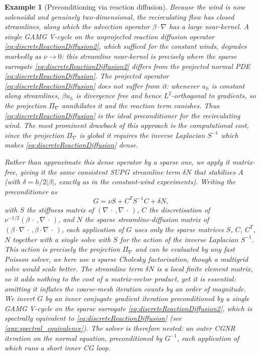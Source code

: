 \documentclass[hidelinks,onefignum,onetabnum]{siamart220329}
\newtheorem{example}{Example}
\begin{document}
\begin{example}[Preconditioning via reaction diffusion]
{    Because the wind is now solenoidal and genuinely two-dimensional, the recirculating flow has closed streamlines, along which the advection operator $\beta\cdot\nabla$ has a large near-kernel. A single GAMG V-cycle on the unprojected reaction diffusion operator \eqref{eq:discreteReactionDiffusion2}, which sufficed for the constant winds, degrades markedly as $\nu\to 0$: this streamline near-kernel is precisely where the sparse surrogate \eqref{eq:discreteReactionDiffusion2} differs from the projected normal PDE \eqref{eq:discreteReactionDiffusion}. The projected operator \eqref{eq:discreteReactionDiffusion} does not suffer from it: whenever $u_h$ is constant along streamlines, $\beta u_h$ is divergence free and hence $L^2$-orthogonal to gradients, so the projection $\Pi_\nabla$ annihilates it and the reaction term vanishes. Thus \eqref{eq:discreteReactionDiffusion} is the ideal preconditioner for the recirculating wind. The most prominent drawback of this approach is the computational cost, since the projection $\Pi_\nabla$ is global it requires the inverse Laplacian $S^{-1}$ which makes \eqref{eq:discreteReactionDiffusion} dense.

    Rather than approximate this dense operator by a sparse one, we apply it \emph{matrix-free}, giving it the same consistent SUPG streamline term $\delta N$ that stabilises $A$ (with $\delta = h/2|\beta|$, exactly as in the constant-wind experiments). Writing the preconditioner as
    \begin{equation}
        \label{eq:glazingMatFree}
        G = \nu S + C^{T} S^{-1} C + \delta N,
    \end{equation}
    with $S$ the stiffness matrix of $(\nabla\,\cdot\,,\nabla\,\cdot\,)$, $C$ the discretisation of $\nu^{-1/2}(\beta\,\cdot\,,\nabla\,\cdot\,)$, and $N$ the sparse streamline-diffusion matrix of $(\beta\cdot\nabla\,\cdot\,,\beta\cdot\nabla\,\cdot\,)$, each application of $G$ uses only the sparse matrices $S$, $C$, $C^{T}$, $N$ together with a single solve with $S$ for the action of the inverse Laplacian $S^{-1}$. This action is precisely the projection $\Pi_\nabla$ and can be evaluated by any fast Poisson solver, we here use a sparse Cholesky factorisation, though a multigrid solve would scale better. The streamline term $\delta N$ is a local finite element matrix, so it adds nothing to the cost of a matrix-vector product, yet it is essential: omitting it inflates the coarse-mesh iteration counts by an order of magnitude. We invert $G$ by an inner conjugate gradient iteration preconditioned by a single GAMG V-cycle on the sparse surrogate \eqref{eq:discreteReactionDiffusion2}, which is spectrally equivalent to \eqref{eq:discreteReactionDiffusion} (see \cref{apx:spectral_equivalence}). The solver is therefore nested: an outer CGNR iteration on the normal equation, preconditioned by $G^{-1}$, each application of which runs a short inner CG loop.

}
\end{example}
\end{document}
